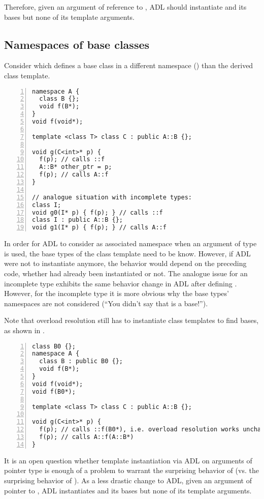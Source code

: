Therefore, given an argument of reference to , ADL should instantiate  and 
its bases but none of its template arguments.

\subsection{Namespaces of base classes}

Consider  which defines a base class in a different namespace 
() than the derived class template.
\begin{lstlisting}[style=Vc,numbers=left,float,label=lst:baseNamespace,caption={
ADL in namespace of base class
}]
namespace A {
  class B {};
  void f(B*);
}
void f(void*);

template <class T> class C : public A::B {};

void g(C<int>* p) {
  f(p); // calls ::f
  A::B* other_ptr = p;
  f(p); // calls A::f
}

// analogue situation with incomplete types:
class I;
void g0(I* p) { f(p); } // calls ::f
class I : public A::B {};
void g1(I* p) { f(p); } // calls A::f
\end{lstlisting}
In order for ADL to consider  as associated namespace when an argument of type 
 is used, the base types of the class template need to be know. However, if 
ADL were not to instantiate  anymore, the behavior would depend on the 
preceding code, whether  had already been instantiated or not. The analogue 
issue for an incomplete type  exhibits the same behavior change in ADL after 
defining . However, for the incomplete type it is more obvious why the base types' 
namespaces are not considered (“You didn't say that  is a base!”).

Note that overload resolution still has to instantiate class templates to find bases, as 
shown in .
\begin{lstlisting}[style=Vc,numbers=left,float,label=lst:instantiateOverloadResolution,caption={
Class template instantiation on overload resolution
}]
class B0 {};
namespace A {
  class B : public B0 {};
  void f(B*);
}
void f(void*);
void f(B0*);

template <class T> class C : public A::B {};

void g(C<int>* p) {
  f(p); // calls ::f(B0*), i.e. overload resolution works unchanged
  f(p); // calls A::f(A::B*)
}
\end{lstlisting}
It is an open question whether template instantiation via ADL on arguments of pointer type 
is enough of a problem to warrant the surprising behavior of 
 (vs. the surprising behavior of ). As a 
less drastic change to ADL, given an argument of pointer to , ADL instantiates 
 and its bases but none of its template arguments.


